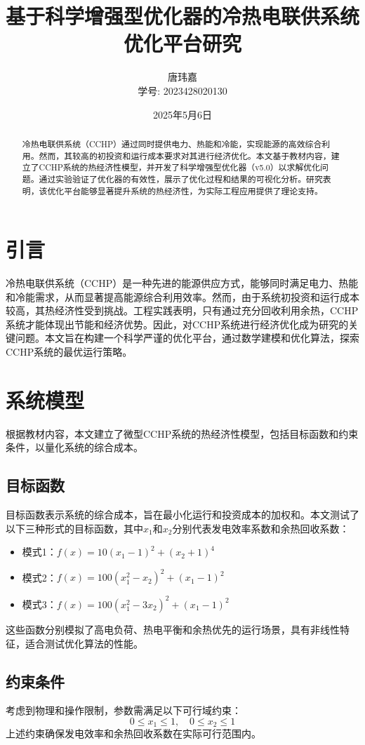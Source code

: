 \documentclass[a4paper,12pt]{article}
\title{基于科学增强型优化器的冷热电联供系统优化平台研究}
\author{唐玮嘉 \\ 学号: 2023428020130}
\date{2025年5月6日}
\begin{document}
\maketitle

\begin{abstract}
冷热电联供系统（CCHP）通过同时提供电力、热能和冷能，实现能源的高效综合利用。然而，其较高的初投资和运行成本要求对其进行经济优化。本文基于教材内容，建立了CCHP系统的热经济性模型，并开发了科学增强型优化器（v5.0）以求解优化问题。通过实验验证了优化器的有效性，展示了优化过程和结果的可视化分析。研究表明，该优化平台能够显著提升系统的热经济性，为实际工程应用提供了理论支持。
\end{abstract}

\section{引言}
冷热电联供系统（CCHP）是一种先进的能源供应方式，能够同时满足电力、热能和冷能需求，从而显著提高能源综合利用效率。然而，由于系统初投资和运行成本较高，其热经济性受到挑战。工程实践表明，只有通过充分回收利用余热，CCHP系统才能体现出节能和经济优势。因此，对CCHP系统进行经济优化成为研究的关键问题。本文旨在构建一个科学严谨的优化平台，通过数学建模和优化算法，探索CCHP系统的最优运行策略。

\section{系统模型}
根据教材内容，本文建立了微型CCHP系统的热经济性模型，包括目标函数和约束条件，以量化系统的综合成本。

\subsection{目标函数}
目标函数表示系统的综合成本，旨在最小化运行和投资成本的加权和。本文测试了以下三种形式的目标函数，其中$x_1$和$x_2$分别代表发电效率系数和余热回收系数：
\begin{itemize}
    \item 模式1：$f(x) = 10(x_1 - 1)^2 + (x_2 + 1)^4$
    \item 模式2：$f(x) = 100(x_1^2 - x_2)^2 + (x_1 - 1)^2$
    \item 模式3：$f(x) = 100(x_1^2 - 3x_2)^2 + (x_1 - 1)^2$
\end{itemize}
这些函数分别模拟了高电负荷、热电平衡和余热优先的运行场景，具有非线性特征，适合测试优化算法的性能。

\subsection{约束条件}
考虑到物理和操作限制，参数需满足以下可行域约束：
\[
0 \leq x_1 \leq 1, \quad 0 \leq x_2 \leq 1
\]
上述约束确保发电效率和余热回收系数在实际可行范围内。
\end{document}
